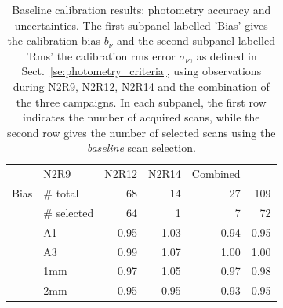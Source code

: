 \begin{table}[!thbp]
  \begin{center}
    \caption[Baseline calibration results]{Baseline calibration results:
  photometry accuracy and uncertainties. The first subpanel labelled 'Bias' gives the
  calibration bias $b_{\nu}$ and the second subpanel labelled 'Rms' the calibration
  rms error $\sigma_{\nu}$, as defined in
  Sect.~\ref{se:photometry_criteria},
  using observations during N2R9, N2R12, N2R14 and the combination of
  the three campaigns. {\lp In each subpanel, the first row indicates the
    number of acquired scans, while the second row gives the
    number of selected scans using the \emph{baseline} scan selection.}}
\label{tab:baseline-photometry}
\begin{tabular}{clrrrr}
  \hline\hline
  \noalign{\smallskip}
  \multicolumn{2}{c}{Characteristics} &  N2R9  & N2R12   &  N2R14 & Combined \\
  \noalign{\smallskip}
  \hline
  \noalign{\smallskip}
  Bias &  $\#$ total    &  68    &  14     &   27     &    109    \\
       &  $\#$ selected &  64    &   1     &   7      &     72    \\
       &  A1            &  0.95  &  1.03   &   0.94   &   0.95    \\
       &  A3            &  0.99  &  1.07   &   1.00   &   1.00    \\
       &  1mm           &  0.97  &  1.05   &   0.97   &   0.98    \\
       &  2mm           &  0.95  &  0.95   &   0.93   &   0.95    \\

\end{tabular}
\end{center}
\end{table}
